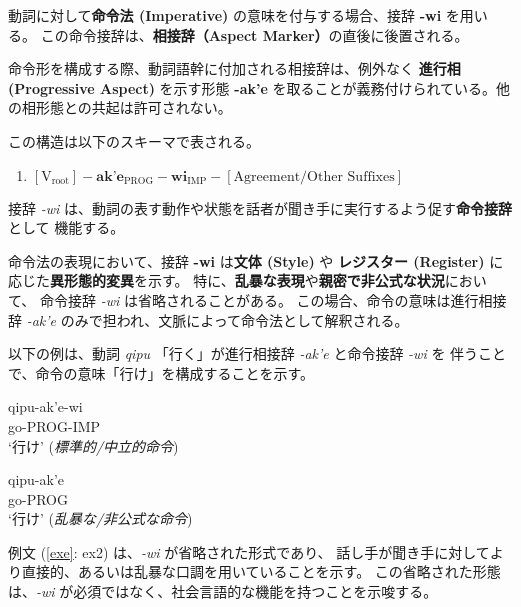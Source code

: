 動詞に対して\textbf{命令法 (Imperative)} の意味を付与する場合、接辞 \textbf{-wi} を用いる。
この命令接辞は、\textbf{相接辞（Aspect Marker）}の直後に後置される。

命令形を構成する際、動詞語幹に付加される相接辞は、例外なく \textbf{進行相 (Progressive Aspect)} 
を示す形態 \textbf{-ak'e} を取ることが義務付けられている。他の相形態との共起は許可されない。

この構造は以下のスキーマで表される。
%
\begin{enumerate}
    \item $[ \text{V}_{\text{root}} ] - \textbf{ak'e}_{\text{PROG}} - \textbf{wi}_{\text{IMP}} - [ \text{Agreement/Other Suffixes} ]$
\end{enumerate}
%
接辞 \textit{-wi} は、動詞の表す動作や状態を話者が聞き手に実行するよう促す\textbf{命令接辞}として
機能する。

命令法の表現において、接辞 \textbf{-wi} は\textbf{文体 (Style)} や
\textbf{レジスター (Register)} に応じた\textbf{異形態的変異}を示す。
特に、\textbf{乱暴な表現}や\textbf{親密で非公式な状況}において、
命令接辞 \textit{-wi} は省略されることがある。
この場合、命令の意味は進行相接辞 \textit{-ak'e} のみで担われ、文脈によって命令法として解釈される。

以下の例は、動詞 \textit{qipu} 「行く」が進行相接辞 \textit{-ak'e} と命令接辞 \textit{-wi} を
伴うことで、命令の意味「行け」を構成することを示す。

\begin{exe}
\ex \gll qipu-ak'e-wi \\
        go-PROG-IMP \\
        \glt `行け' \hfill (\textit{標準的/中立的命令})
\end{exe}

\begin{exe}
\ex \gll qipu-ak'e \\
        go-PROG \\
        \glt `行け' \hfill (\textit{乱暴な/非公式な命令})
\end{exe}
%
例文 (\ref{exe}: ex2) は、\textit{-wi} が省略された形式であり、
話し手が聞き手に対してより直接的、あるいは乱暴な口調を用いていることを示す。
この省略された形態は、\textit{-wi} が必須ではなく、社会言語的な機能を持つことを示唆する。